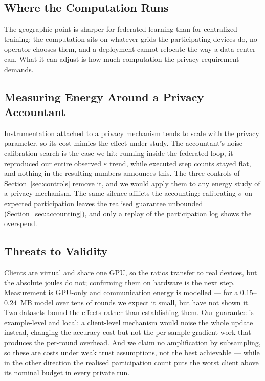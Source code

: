 \subsection{Where the Computation Runs}

The geographic point is sharper for federated learning than for centralized
training: the computation sits on whatever grids the participating devices do,
no operator chooses them, and a deployment cannot relocate the way a data
center can. What it can adjust is how much computation the privacy requirement
demands.

\subsection{Measuring Energy Around a Privacy Accountant}

Instrumentation attached to a privacy mechanism tends to scale with the
privacy parameter, so its cost mimics the effect under study. The accountant's
noise-calibration search is the case we hit: running inside the federated loop, it
reproduced our entire observed $\varepsilon$ trend, while executed step counts
stayed flat, and nothing in the resulting numbers announces this. The three controls of
Section~\ref{sec:controls} remove it, and we would apply them to any energy
study of a privacy mechanism. The same silence afflicts the
accounting: calibrating $\sigma$ on expected participation leaves the realised
guarantee unbounded (Section~\ref{sec:accounting}), and only a replay of the
participation log shows the overspend.

\subsection{Threats to Validity}

Clients are virtual and share one GPU, so the ratios transfer to real devices,
but the absolute joules do not; confirming them on hardware is the next step. Measurement is GPU-only and communication energy is
modelled --- for a $0.15$--$0.24$~MB model over tens of rounds we expect it
small, but have not shown it. Two datasets bound the effects rather than
establishing them. Our guarantee is example-level and local: a client-level mechanism would noise
the whole update instead, changing the accuracy cost but not the per-sample
gradient work that produces the per-round overhead. And we claim no
amplification by subsampling, so these are costs under weak trust assumptions,
not the best achievable --- while in the other direction the realised
participation count puts the worst client above its nominal budget in every
private run.
